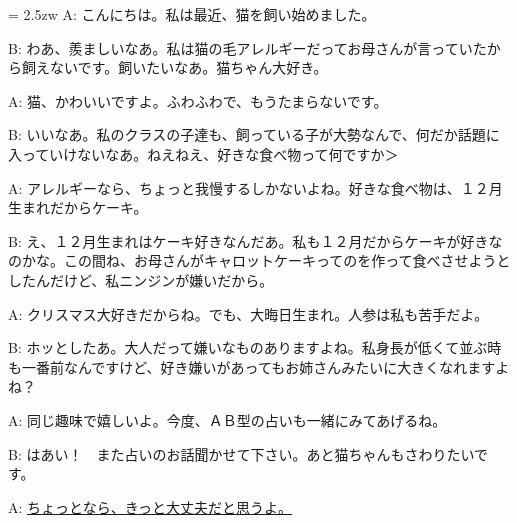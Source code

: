 \documentclass[11pt]{amsart}
\title{}
\author{}
\newenvironment{hangall}[1]{\hangindent = 2.5zw\everypar{\hangindent = 2.5zw}}{}
\begin{document}
\maketitle
\begin{hangall}{}%
A: こんにちは。私は最近、猫を飼い始めました。

B: わあ、羨ましいなあ。私は猫の毛アレルギーだってお母さんが言っていたから飼えないです。飼いたいなあ。猫ちゃん大好き。

A: 猫、かわいいですよ。ふわふわで、もうたまらないです。

B: いいなあ。私のクラスの子達も、飼っている子が大勢なんで、何だか話題に入っていけないなあ。ねえねえ、好きな食べ物って何ですか＞

A: アレルギーなら、ちょっと我慢するしかないよね。好きな食べ物は、１２月生まれだからケーキ。

B: え、１２月生まれはケーキ好きなんだあ。私も１２月だからケーキが好きなのかな。この間ね、お母さんがキャロットケーキってのを作って食べさせようとしたんだけど、私ニンジンが嫌いだから。

A: クリスマス大好きだからね。でも、大晦日生まれ。人参は私も苦手だよ。

B: ホッとしたあ。大人だって嫌いなものありますよね。私身長が低くて並ぶ時も一番前なんですけど、好き嫌いがあってもお姉さんみたいに大きくなれますよね？

A: 同じ趣味で嬉しいよ。今度、ＡＢ型の占いも一緒にみてあげるね。

B: はあい！　また占いのお話聞かせて下さい。あと猫ちゃんもさわりたいです。

A: \ul{ちょっとなら、きっと大丈夫だと思うよ。}\end{hangall}
\end{document}
